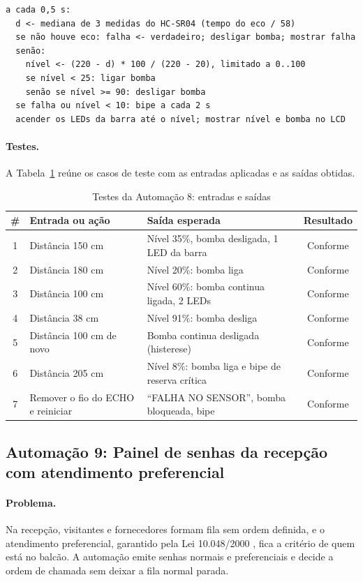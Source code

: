 \documentclass[12pt]{article}
\newcommand{\conf}{Conforme}
\begin{document}
\begin{lstlisting}[style=pseudo]
a cada 0,5 s:
  d <- mediana de 3 medidas do HC-SR04 (tempo do eco / 58)
  se não houve eco: falha <- verdadeiro; desligar bomba; mostrar falha
  senão:
    nível <- (220 - d) * 100 / (220 - 20), limitado a 0..100
    se nível < 25: ligar bomba
    senão se nível >= 90: desligar bomba
  se falha ou nível < 10: bipe a cada 2 s
  acender os LEDs da barra até o nível; mostrar nível e bomba no LCD
\end{lstlisting}

\paragraph{Testes.} A Tabela~\ref{tab:teste8} reúne os casos de teste com as entradas aplicadas e as saídas obtidas.

\begin{table}[!htb]
\centering
\caption{Testes da Automação 8: entradas e saídas}\label{tab:teste8}
\small
\begin{tabularx}{\textwidth}{cXXc}
\toprule
\# & Entrada ou ação & Saída esperada & Resultado \\
\midrule
1 & Distância 150 cm & Nível 35\%, bomba desligada, 1 LED da barra & \conf \\
2 & Distância 180 cm & Nível 20\%: bomba liga & \conf \\
3 & Distância 100 cm & Nível 60\%: bomba continua ligada, 2 LEDs & \conf \\
4 & Distância 38 cm & Nível 91\%: bomba desliga & \conf \\
5 & Distância 100 cm de novo & Bomba continua desligada (histerese) & \conf \\
6 & Distância 205 cm & Nível 8\%: bomba liga e bipe de reserva crítica & \conf \\
7 & Remover o fio do ECHO e reiniciar & ``FALHA NO SENSOR'', bomba bloqueada, bipe & \conf \\
\bottomrule
\end{tabularx}
\end{table}



\subsection{Automação 9: Painel de senhas da recepção com atendimento preferencial}\label{sub:a9}

\paragraph{Problema.} Na recepção, visitantes e fornecedores formam fila sem ordem definida, e o atendimento preferencial, garantido pela Lei 10.048/2000 \cite{lei10048}, fica a critério de quem está no balcão. A automação emite senhas normais e preferenciais e decide a ordem de chamada sem deixar a fila normal parada.
\end{document}
